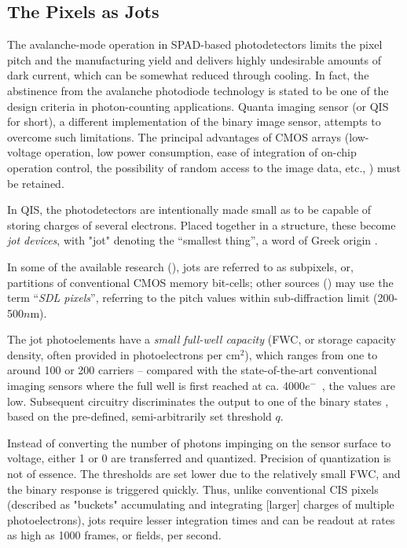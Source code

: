 \subsection{The Pixels as Jots}

The avalanche-mode operation in SPAD-based photodetectors limits the pixel pitch and the manufacturing yield and delivers highly undesirable amounts of dark current, which can be somewhat reduced through cooling. In fact, the abstinence from the avalanche photodiode technology is stated to be one of the design criteria in photon-counting applications.
Quanta imaging sensor (or QIS for short), a different implementation of the binary image sensor, attempts to overcome such limitations\cite{Ma:17, Ma03rmsJot}.
The principal advantages of CMOS arrays (low-voltage operation, low power consumption, ease of integration of on-chip operation control, the possibility of random access to the image data, etc., \cite{Holst2011}) must be retained. %

In QIS, the photodetectors are intentionally made small as to be capable of storing charges of several electrons. 
Placed together in a structure, these become \textit{jot devices}, with "jot" denoting the ``smallest thing'', a word of Greek origin \cite{FossumSiMulQIS}.

In some of the available research (\cite{s16111961}), jots are referred to as subpixels, or, partitions of conventional CMOS memory bit-cells; other sources (\cite{fossum2016quanta}) may use the term ``\textit{SDL pixels}'', referring to the pitch values within sub-diffraction limit (200-500$n$m).

The jot photoelements have a \textit{small full-well capacity} (FWC, or storage capacity density, often provided in photoelectrons per cm$^2$), which ranges from one to around 100 or 200 carriers -- compared with the state-of-the-art conventional imaging sensors where the full well is first reached at ca. 4000$e^{-}$~\cite{Gnanasambandam_2020}, the values are low. Subsequent circuitry discriminates the output to one of the binary states \cite{FossumSiMulQIS}, based on the pre-defined, semi-arbitrarily set threshold $q$. 

Instead of converting the number of photons impinging on the sensor surface to voltage, either 1 or 0 are transferred and quantized. Precision of quantization is not of essence. The thresholds are set lower due to the relatively small FWC, and the binary response is triggered quickly. Thus, unlike conventional CIS pixels (described as "buckets" accumulating and integrating [larger] charges of multiple photoelectrons), jots require lesser integration times and can be readout at rates as high as 1000 frames, or fields, per second. 

